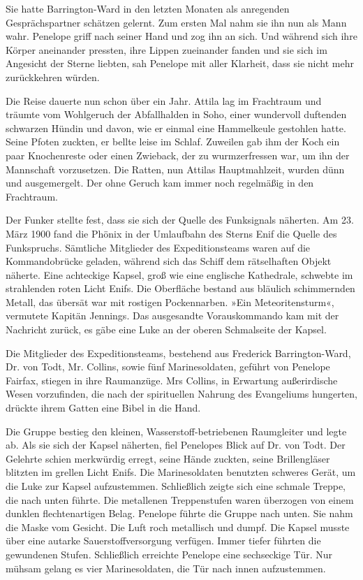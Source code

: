 Sie hatte Barrington-Ward in den letzten Monaten als anregenden
Gesprächspartner schätzen gelernt. Zum ersten Mal nahm sie ihn nun
als Mann wahr. Penelope griff nach seiner Hand und zog ihn an sich.
Und während sich ihre Körper aneinander pressten, ihre Lippen
zueinander fanden und sie sich im Angesicht der Sterne liebten, sah
Penelope mit aller Klarheit, dass sie nicht mehr zurückkehren
würden.

\tb

Die Reise dauerte nun schon über ein Jahr. Attila lag im Frachtraum
und träumte vom Wohlgeruch der Abfallhalden in Soho, einer
wundervoll duftenden schwarzen Hündin und davon, wie er einmal eine
Hammelkeule gestohlen hatte. Seine Pfoten zuckten, er bellte leise
im Schlaf. Zuweilen gab ihm der Koch ein paar Knochenreste oder
einen Zwieback, der zu wurmzerfressen war, um ihn der Mannschaft
vorzusetzen. Die Ratten, nun Attilas Hauptmahlzeit, wurden dünn und
ausgemergelt. Der ohne Geruch kam immer noch regelmäßig in den
Frachtraum.

\tb

Der Funker stellte fest, dass sie sich der Quelle des Funksignals
näherten. Am 23. März 1900 fand die Phönix in der Umlaufbahn des
Sterns Enif die Quelle des Funkspruchs. Sämtliche Mitglieder des
Expeditionsteams waren auf die Kommandobrücke geladen, während sich
das Schiff dem rätselhaften Objekt näherte. Eine achteckige Kapsel,
groß wie eine englische Kathedrale, schwebte im strahlenden roten
Licht Enifs. Die Oberfläche bestand aus bläulich schimmernden
Metall, das übersät war mit rostigen Pockennarben. »Ein
Meteoritensturm«, vermutete Kapitän Jennings. Das ausgesandte
Vorauskommando kam mit der Nachricht zurück, es gäbe eine Luke an
der oberen Schmalseite der Kapsel.

Die Mitglieder des Expeditionsteams, bestehend aus Frederick
Barrington-Ward, Dr. von Todt, Mr. Collins, sowie fünf
Marinesoldaten, geführt von Penelope Fairfax, stiegen in ihre
Raumanzüge. Mrs Collins, in Erwartung außerirdische Wesen
vorzufinden, die nach der spirituellen Nahrung des Evangeliums
hungerten, drückte ihrem Gatten eine Bibel in die Hand.

Die Gruppe bestieg den kleinen, Wasserstoff-betriebenen Raumgleiter
und legte ab. Als sie sich der Kapsel näherten, fiel Penelopes
Blick auf Dr. von Todt. Der Gelehrte schien merkwürdig erregt,
seine Hände zuckten, seine Brillengläser blitzten im grellen Licht
Enifs. Die Marinesoldaten benutzten schweres Gerät, um die Luke zur
Kapsel aufzustemmen. Schließlich zeigte sich eine schmale Treppe,
die nach unten führte. Die metallenen Treppenstufen waren überzogen
von einem dunklen flechtenartigen Belag. Penelope führte die Gruppe
nach unten. Sie nahm die Maske vom Gesicht. Die Luft roch
metallisch und dumpf. Die Kapsel musste über eine autarke
Sauerstoffversorgung verfügen. Immer tiefer führten die gewundenen
Stufen. Schließlich erreichte Penelope eine sechseckige Tür. Nur
mühsam gelang es vier Marinesoldaten, die Tür nach innen
aufzustemmen.

